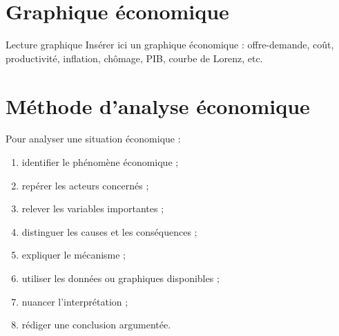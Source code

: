 \documentclass[11pt,a4paper]{article}
\begin{document}
\section{Graphique économique}

\begin{cadregris}{Lecture graphique}
Insérer ici un graphique économique : offre-demande, coût, productivité, inflation, chômage, PIB, courbe de Lorenz, etc.

\medskip

\begin{center}
\end{center}
\end{cadregris}

\section{Méthode d’analyse économique}

\begin{cadremethode}
Pour analyser une situation économique :

\begin{enumerate}
    \item identifier le phénomène économique ;
    \item repérer les acteurs concernés ;
    \item relever les variables importantes ;
    \item distinguer les causes et les conséquences ;
    \item expliquer le mécanisme ;
    \item utiliser les données ou graphiques disponibles ;
    \item nuancer l’interprétation ;
    \item rédiger une conclusion argumentée.
\end{enumerate}
\end{cadremethode}
\end{document}
